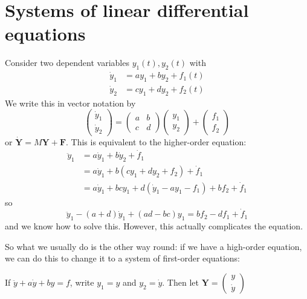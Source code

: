 \documentclass[a4paper]{article}
\theoremstyle{definition}
\newcommand{\mb}[1]{\mathbf{#1}}
\let\stdsection\section
\renewcommand\section{\newpage\stdsection}
\begin{document}
\section{Systems of linear differential equations}
Consider two dependent variables $y_1(t), y_2(t)$ with
\begin{align*}
  \dot y_1 &= ay_1 + by_2 + f_1(t)\\
  \dot y_2 &= cy_1 + dy_2 + f_2(t)
\end{align*}
We write this in vector notation by 
\[
\begin{pmatrix}
  \dot y_1\\\dot y_2 
\end{pmatrix} = 
\begin{pmatrix}
  a & b\\
  c & d
\end{pmatrix}
\begin{pmatrix}
  y_1\\y_2
\end{pmatrix} + 
\begin{pmatrix}
   f_1\\f_2
\end{pmatrix}
\]
or $\mb{\dot Y} = M\mb{Y} + \mb{F}$. This is equivalent to the higher-order equation:
\begin{align*}
  \ddot y_1 &= a\dot y_1 + b\dot y_2 + \dot f_1\\
  &= a\dot y_1 + b(cy_1 + dy_2 + f_2) + \dot f_1\\
  &= a\dot y_1 + bcy_1 + d(\dot y_1 - ay_1 - f_1) + bf_2 + \dot f_1
\end{align*}
so
\[
\ddot y_1 - (a + d)\dot y_1 + (ad - bc) y_1 = bf_2 - df_1 + \dot f_1
\]
and we know how to solve this. However, this actually complicates the equation.

So what we usually do is the other way round: if we have a high-order equation, we can do this to change it to a system of first-order equations:

If $\ddot y + a\dot y + by = f$, write $y_1 = y$ and $y_2 = \dot y$. Then let $\mb{Y} = 
\begin{pmatrix}
  y\\\dot y
\end{pmatrix}$
\end{document}

